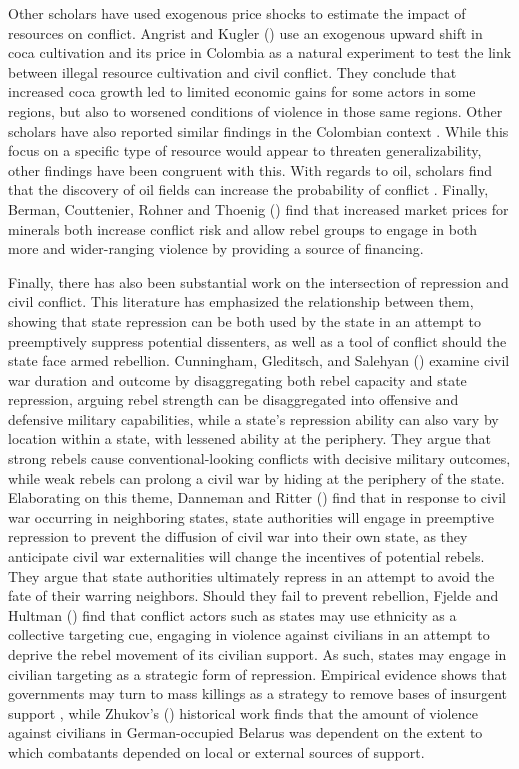 Other scholars have used exogenous price shocks to estimate the impact of resources on conflict. Angrist and Kugler (\citeyear{AK08}) use an exogenous upward shift in coca cultivation and its price in Colombia as a natural experiment to test the link between illegal resource cultivation and civil conflict. They conclude that increased coca growth led to limited economic gains for some actors in some regions, but also to worsened conditions of violence in those same regions. Other scholars have also reported similar findings in the Colombian context \cite{DV13,CD17}. While this focus on a specific type of resource would appear to threaten generalizability, other findings have been congruent with this. With regards to oil, scholars find that the discovery of oil fields can increase the probability of conflict \cite{LM14}. Finally, Berman, Couttenier, Rohner and Thoenig (\citeyear{BCRT17}) find that increased market prices for minerals both increase conflict risk and allow rebel groups to engage in both more and wider-ranging violence by providing a source of financing. 

Finally, there has also been substantial work on the intersection of repression and civil conflict. This literature has emphasized the relationship between them, showing that state repression can be both used by the state in an attempt to preemptively suppress potential dissenters, as well as a tool of conflict should the state face armed rebellion. Cunningham, Gleditsch, and Salehyan (\citeyear{Cunninghametal09}) examine civil war duration and outcome by disaggregating both rebel capacity and state repression, arguing rebel strength can be disaggregated into offensive and defensive military capabilities, while a state’s repression ability can also vary by location within a state, with lessened ability at the periphery. They argue that strong rebels cause conventional-looking conflicts with decisive military outcomes, while weak rebels can prolong a civil war by hiding at the periphery of the state. Elaborating on this theme, Danneman and Ritter (\citeyear{DannemanRitter14}) find that in response to civil war occurring in neighboring states, state authorities will engage in preemptive repression to prevent the diffusion of civil war into their own state, as they anticipate civil war externalities will change the incentives of potential rebels. They argue that state authorities ultimately repress in an attempt to avoid the fate of their warring neighbors. Should they fail to prevent rebellion, Fjelde and Hultman (\citeyear{FH14}) find that conflict actors such as states may use ethnicity as a collective targeting cue, engaging in violence against civilians in an attempt to deprive the rebel movement of its civilian support. As such, states may engage in civilian targeting as a strategic form of repression. Empirical evidence shows that governments may turn to mass killings as a strategy to remove bases of insurgent support \cite{VHB04}, while Zhukov’s (\citeyear{Z17}) historical work finds that the amount of violence against civilians in German-occupied Belarus was dependent on the extent to which combatants depended on local or external sources of support.

